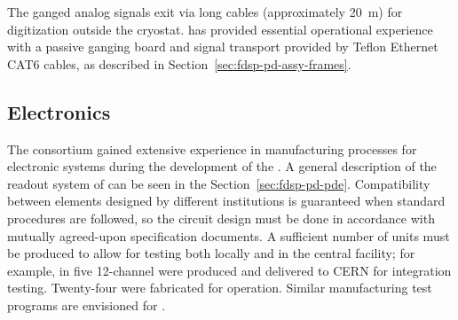 The ganged analog signals exit via long cables (approximately \SI{20}{m}) for digitization outside the cryostat.
 has provided essential operational experience with a passive ganging board and signal transport provided by Teflon Ethernet CAT6 cables, as described in Section~\ref{sec:fdsp-pd-assy-frames}.


\subsection{Electronics}
\label{sec:fdsp-pd-assy-pde}

The  consortium gained extensive experience in manufacturing processes for electronic systems %
during the development of the  . %
A general description of the readout system of  can be seen in the Section~\ref{sec:fdsp-pd-pde}. Compatibility between elements designed by different institutions is guaranteed when standard procedures are followed, so the circuit design must be done in accordance with mutually agreed-upon specification documents.  A sufficient  number of units must be produced to allow %
for testing both locally and  in the central facility; for example, in  five 12-channel   were produced and delivered to CERN for integration testing. Twenty-four were fabricated for  operation. Similar manufacturing test programs are envisioned for .

